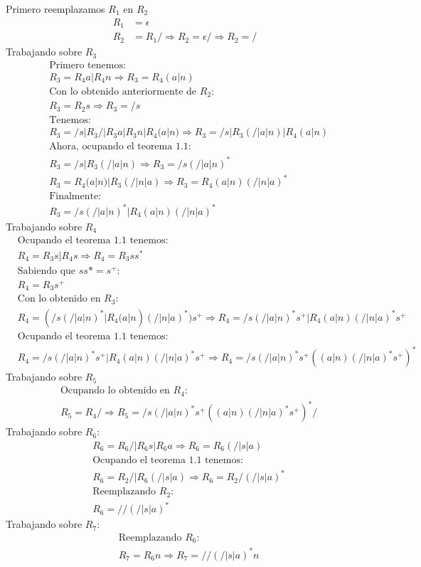 \documentclass[spanish, fleqn]{article}
\begin{document}
\begin{enumerate}
    Primero reemplazamos $R_{1}$ en $R_{2}$
    \begin{align*}
    R_{1}&=\epsilon \\
    R_{2}&=R_{1}/ \Rightarrow R_{2}=\epsilon/ \Rightarrow R_{2}=/
    \end{align*}
    Trabajando sobre $R_3$
    \begin{align*}
    &\text{Primero tenemos:}\\
    &R_3=R_{4}a|R_{4}n \Rightarrow R_3=R_4(a|n)\\
    &\text{Con lo obtenido anteriormente de $R_2$:}\\
    &R_3=R_2s \Rightarrow R_3=/s\\
    &\text{Tenemos:}\\
    &R_3=/s|R_{3}/|R_{3}a|R_{3}n|R_4(a|n) \Rightarrow R_3=/s|R_3(/|a|n)|R_4(a|n) \\
    &\text{Ahora, ocupando el teorema 1.1:}\\
    &R_3=/s|R_3(/|a|n) \Rightarrow R_3=/s(/|a|n)^*\\
    &R_3=R_4(a|n)|R_3(/|n|a) \Rightarrow R_3=R_4(a|n)(/|n|a)^*\\
    &\text{Finalmente:}\\
    &R_3=/s(/|a|n)^*|R_4(a|n)(/|n|a)^*
    \end{align*}
    Trabajando sobre $R_4$
    \begin{align*}
    &\text{Ocupando el teorema 1.1 tenemos:}\\
    &R_4=R_3s|R_4s \Rightarrow R_4=R_3ss^*\\
    &\text{Sabiendo que $ss*=s^+$:}\\
    &R_4=R_3s^+\\
    &\text{Con lo obtenido en $R_3$:}\\
    &R_4=(/s(/|a|n)^*|R_4(a|n)(/|n|a)^*)s^+ \Rightarrow R_4=/s(/|a|n)^*s^+|R_4(a|n)(/|n|a)^*s^+\\
    &\text{Ocupando el teorema 1.1 tenemos:}\\
    &R_4=/s(/|a|n)^*s^+|R_4(a|n)(/|n|a)^*s^+ \Rightarrow R_4=/s(/|a|n)^*s^+((a|n)(/|n|a)^*s^+)^*
    \end{align*}
    Trabajando sobre $R_5$
    \begin{align*}
	&\text{Ocupando lo obtenido en $R_4$:}\\
    &R_5=R_4/ \Rightarrow R_5=/s(/|a|n)^*s^+((a|n)(/|n|a)^*s^+)^*/
    \end{align*}
    Trabajando sobre $R_6$:
    \begin{align*}
	&R_6=R_{6}/|R_{6}s|R_{6}a \Rightarrow R_6=R_6(/|s|a)\\
	&\text{Ocupando el teorema 1.1 tenemos:}\\
	&R_6=R_2/|R_6(/|s|a) \Rightarrow R_6=R_2/(/|s|a)^*\\
	&\text{Reemplazando $R_2$:}\\
	&R_6=//(/|s|a)^*
    \end{align*}
    Trabajando sobre $R_7$:
    \begin{align*}
    &\text{Reemplazando $R_6$:}\\
    &R_7=R_6n \Rightarrow R_7=//(/|s|a)^*n
    \end{align*}
    

\end{enumerate}
\end{document}
